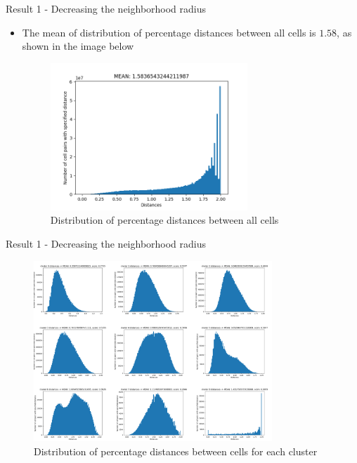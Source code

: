 \documentclass{beamer}
\begin{document}
\begin{frame}{Result 1 - Decreasing the neighborhood radius}

\begin{itemize}
    \item<1-> The mean of distribution of percentage distances between all cells is $1.58$, as shown in the image below
    \begin{figure}
    \centering
    \includegraphics[width=0.7\textwidth]{all_distances2_1.png}
    \caption{Distribution of percentage distances between all cells}
\end{figure} 
   
\end{itemize}
\end{frame}
\begin{frame}{Result 1 - Decreasing the neighborhood radius}

\begin{figure}
    \centering
    \includegraphics[width=0.8\textwidth]{stats_clusters1.png}
    \caption{Distribution of percentage distances between cells for each cluster}
\end{figure} 

\end{frame}
\end{document}
